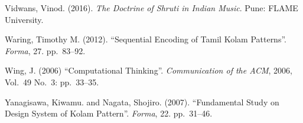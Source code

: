 \begin{thebibliography}{99}
Vidwans, Vinod. (2016). \textsl{The Doctrine of Shruti in Indian Music}. Pune: FLAME University.

Waring, Timothy M. (2012). “Sequential Encoding of Tamil Kolam Patterns”. \textsl{Forma}, 27. pp.~83--92.

Wing, J. (2006) “Computational Thinking”. \textsl{Communication of the ACM}, 2006, Vol.~49 No.~3: pp.~33--35.

Yanagisawa, Kiwamu. and Nagata, Shojiro. (2007). “Fundamental Study on Design System of Kolam Pattern”. \textsl{Forma}, 22. pp.~31--46.

\end{thebibliography}

\theendnotes
